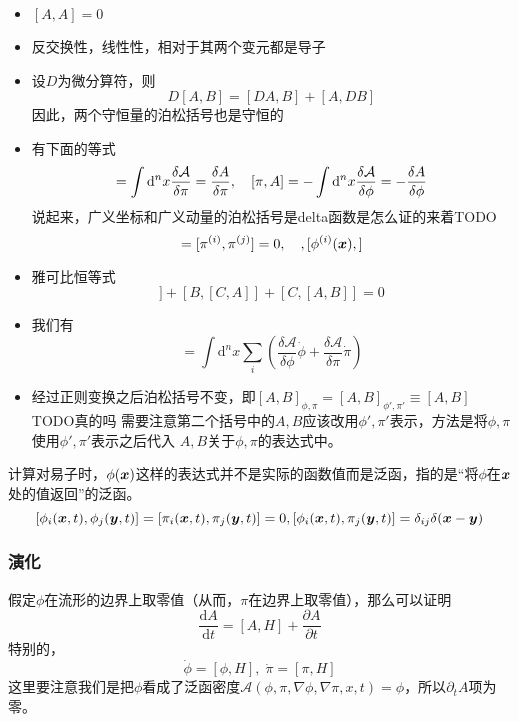 \documentclass[UTF8, a4paper]{ctexart}
\begin{document}
\begin{itemize}
    \item $[A, A]=0$
    \item 反交换性，线性性，相对于其两个变元都是导子
    \item  设$D$为微分算符，则
        \begin{equation}
            D[A, B] = [DA, B] + [A, DB]
            \label{eq:derivative-of-poison-brackets}
        \end{equation}
        因此，两个守恒量的泊松括号也是守恒的
    \item 有下面的等式
    \begin{equation}
        [\phi, A] = \int \mathrm{d}^n x \frac{\delta \mathcal{A}}{\delta \pi} = \fdv{A}{\pi}, \quad [\pi, A] = - \int \mathrm{d}^n x \frac{\delta \mathcal{A}}{\delta \phi} = -\fdv{A}{\phi}
    \end{equation}
    说起来，广义坐标和广义动量的泊松括号是delta函数是怎么证的来着TODO
    \begin{equation}
        [\phi^{(i)}, \phi^{(j)}] = [\pi^{(i)}, \pi^{(j)}] = 0, \quad, [\phi^{(i)}(\vb*{x}), ] 
    \end{equation}
    \item 雅可比恒等式
    \begin{equation}
        [A, [B, C]] + [B, [C, A]] + [C, [A, B]] = 0
        \label{eq:jacobi-identity}
    \end{equation}
    \item 我们有
    \begin{equation}
        [A, H] = \int \mathrm{d}^n x \sum_i \left(
        \frac{\delta \mathcal{A}}{\delta \phi} \dot{\phi} + \frac{\delta \mathcal{A}}{\delta \pi} \dot{\pi}     
        \right)
    \end{equation}
    \item 经过正则变换之后泊松括号不变，即$[A, B]_{\phi, \pi} = [A, B]_{\phi', \pi'} \equiv [A, B]$ TODO真的吗
    需要注意第二个括号中的$A,B$应该改用$\phi', \pi'$表示，方法是将$\phi, \pi$使用$\phi', \pi'$表示之后代入
    $A, B$关于$\phi, \pi$的表达式中。
\end{itemize}

计算对易子时，$\phi(\vb*{x})$这样的表达式并不是实际的函数值而是泛函，指的是“将$\phi$在$\vb*{x}$处的值返回”的泛函。
\[
    [\phi_i(\vb*{x}, t), \phi_j(\vb*{y}, t)] = [\pi_i(\vb*{x}, t), \pi_j(\vb*{y}, t)] = 0, 
    [\phi_i(\vb*{x}, t), \pi_j(\vb*{y}, t)] = \delta_{ij} \delta(\vb*{x} - \vb*{y})
\]

\subsubsection{演化}
假定$\phi$在流形的边界上取零值（从而，$\pi$在边界上取零值），那么可以证明
\begin{equation}
    \frac{\mathrm{d}A}{\mathrm{d}t} = [A, H] + \frac{\partial A}{\partial t}
    \label{eq:time-evolution}
\end{equation}
特别的，
\begin{equation}
    \dot{\phi} = [\phi, H], \; \dot{\pi} = [\pi, H]
\end{equation}
这里要注意我们是把$\phi$看成了泛函密度$\mathcal{A}(\phi, \pi, \nabla \phi, \nabla \pi, x, t) = \phi$，所以$\partial_t A$项为零。
\end{document}
